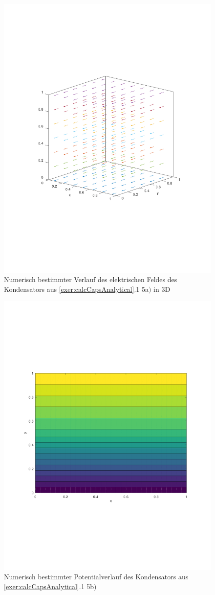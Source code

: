 \documentclass[Protokollheft.tex]{subfiles}
\begin{document}
\begin{figure}[h!]
	\centering
	\includegraphics[trim = 20mm 70mm 20mm 70mm, clip,width=0.7\linewidth]{E_3D_A.pdf}
	\caption{Numerisch bestimmter Verlauf des elektrischen Feldes des Kondensators aus \ref{exer:calcCapsAnalytical}.1 5a$)$ in 3D}
	\label{fig:potA}
\end{figure}

\begin{figure}[h!]
	\centering
	\includegraphics[trim = 20mm 70mm 20mm 70mm, clip,width=0.7\linewidth]{potential_B.pdf}
	\caption{Numerisch bestimmter Potentialverlauf des Kondensators aus \ref{exer:calcCapsAnalytical}.1 5b$)$}
\end{figure}
\end{document}
